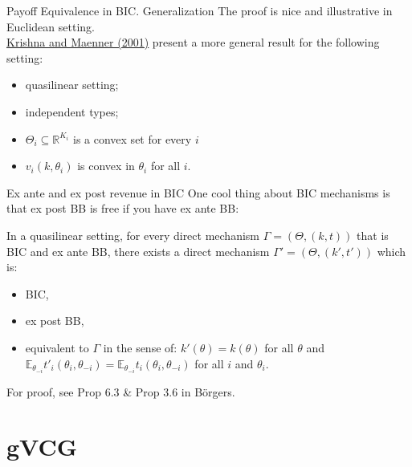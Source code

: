 \documentclass[english,10pt
,aspectratio=169
,handout
]{beamer}
\begin{document}
\begin{frame}{Payoff Equivalence in BIC. Generalization}
	The proof is nice and illustrative in Euclidean setting.\\ \href{https://onlinelibrary.wiley.com/doi/abs/10.1111/1468-0262.00233}{\uline{Krishna and Maenner (2001)}} present a more general result for the following setting:
	\begin{itemize}
		\item quasilinear setting;
		\item independent types;
		\item $\Theta_i \subseteq \mathbb{R}^{K_i}$ is a convex set for every $i$ 
		\item $v_i(k,\theta_i)$ is convex in $\theta_i$ for all $i$.
	\end{itemize}
\end{frame}


\begin{frame}{Ex ante and ex post revenue in BIC}
	One cool thing about BIC mechanisms is that ex post BB is free if you have ex ante BB:
	\begin{theorem}
		In a \alert{quasilinear} setting, for every direct mechanism $\Gamma = (\Theta, (k,t))$ that is BIC and \alert{ex ante BB}, there exists a direct mechanism $\Gamma' = (\Theta, (k',t'))$ which is:
		\begin{itemize}
			\item BIC,
			\item \alert{ex post BB},
			\item equivalent to $\Gamma$ in the sense of: $k'(\theta) = k(\theta)$ for all $\theta$ and $\mathbb{E}_{\theta_{-i}} t'_i(\theta_i,\theta_{-i}) = \mathbb{E}_{\theta_{-i}} t_i(\theta_i,\theta_{-i})$ for all $i$ and $\theta_i$.
		\end{itemize}
	\end{theorem}
	For proof, see Prop 6.3 \& Prop 3.6 in B{\"o}rgers.
\end{frame}


\section{gVCG}
\end{document}
